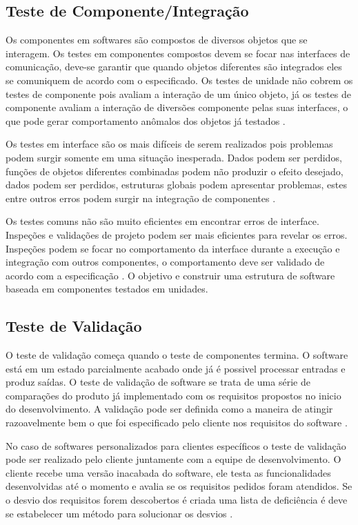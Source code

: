 \subsection{Teste de Componente/Integração}

Os componentes em softwares são compostos de diversos objetos que se interagem. Os testes em componentes compostos devem se focar nas interfaces de comunicação, deve-se garantir que quando objetos diferentes são integrados eles se comuniquem de acordo com o especificado. Os testes de unidade não cobrem os testes de componente pois avaliam a interação de um único objeto, já os testes de componente avaliam a interação de diversões componente pelas suas interfaces, o que pode gerar comportamento anômalos dos objetos já testados \cite{SOMMER2011}.


Os testes em interface são os mais difíceis de serem realizados pois problemas podem surgir somente em uma situação inesperada. Dados podem ser perdidos, funções de objetos diferentes combinadas podem não produzir o efeito desejado, dados podem ser perdidos, estruturas globais podem apresentar problemas, estes entre outros erros podem surgir na integração de componentes \cite{PRESMA2016}.


Os testes comuns não são muito eficientes em encontrar erros de interface. Inspeções e validações de projeto podem ser mais eficientes para revelar os erros. Inspeções podem se focar no comportamento da interface durante a execução e integração com outros componentes, o comportamento deve ser validado de acordo com a especificação \cite{SOMMER2011}. O objetivo e construir uma estrutura de software baseada em componentes testados em unidades.


 
\subsection{Teste de Validação}

O teste de validação começa quando o teste de componentes termina. O software está em um estado parcialmente acabado onde já é possivel processar entradas e produz saídas. O teste de validação de software se trata de uma série de comparações do produto já implementado com os requisitos propostos no inicio do desenvolvimento. A validação pode ser definida como a maneira de atingir razoavelmente bem o que foi especificado pelo cliente nos requisitos do software \cite{PRESMA2016}.  


No caso de softwares personalizados para clientes específicos o teste de validação pode ser realizado pelo cliente juntamente com a equipe de desenvolvimento. O cliente recebe uma versão inacabada do software, ele testa as funcionalidades desenvolvidas até o momento e avalia se os requisitos pedidos foram atendidos. Se o  desvio dos requisitos forem descobertos é criada uma lista de deficiência é deve se estabelecer um método para solucionar os desvios \cite{PRESMA2016}.


